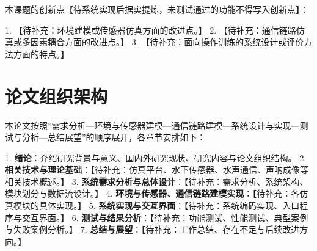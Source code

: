 本课题的创新点【待系统实现后据实提炼，未测试通过的功能不得写入创新点】：

1. 【待补充：环境建模或传感器仿真方面的改进点。】
2. 【待补充：通信链路仿真或多因素耦合方面的改进点。】
3. 【待补充：面向操作训练的系统设计或评价方法方面的特点。】

\section{论文组织架构}

本论文按照“需求分析—环境与传感器建模—通信链路建模—系统设计与实现—测试与分析—总结展望”的顺序展开，各章节安排如下：

1. \textbf{绪论}：介绍研究背景与意义、国内外研究现状、研究内容与论文组织结构。
2. \textbf{相关技术与理论基础}：【待补充：仿真平台、水下传感器、水声通信、声呐成像等相关技术概述。】
3. \textbf{系统需求分析与总体设计}：【待补充：需求分析、系统架构、模块划分与数据流设计。】
4. \textbf{环境与传感器、通信链路建模实现}：【待补充：各仿真模块的具体实现。】
5. \textbf{系统实现与交互界面}：【待补充：系统编码实现、入口程序与交互界面。】
6. \textbf{测试与结果分析}：【待补充：功能测试、性能测试、典型案例与失败案例分析。】
7. \textbf{总结与展望}：【待补充：工作总结、存在不足与后续改进方向。】
